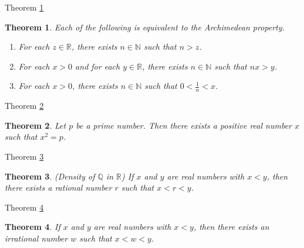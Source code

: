 \documentclass[avery5371,grid]{flashcards}
\newtheorem{theorem}{Theorem}
\newcommand{\bb}[1]{\mathbb{#1}}
\newcommand{\Q}{\bb{Q}}
\newcommand{\R}{\bb{R}}
\newcommand{\N}{\bb{N}}
\begin{document}
\begin{flashcard}[Theorem]{Theorem \ref{thm37}}
\begin{theorem}
\label{thm37}
Each of the following is equivalent to the Archimedean property.
\begin{enumerate}
\item For each $z \in \R$, there exists $n\in \N$ such that $n>z$.
\item For each $x>0$ and for each $y \in \R$, there exists $n \in \N$
such that $nx > y$.
\item For each $x > 0$, there exists $n \in \N$ such that
$0 < \frac{1}{n} < x$.
\end{enumerate}
\end{theorem}
\end{flashcard}

\begin{flashcard}[Theorem]{Theorem \ref{thm38}}
\begin{theorem}
\label{thm38}
Let $p$ be a prime number.  Then there exists a positive real number $x$
such that $x^2=p$.
\end{theorem}
\end{flashcard}

\begin{flashcard}[Theorem]{Theorem \ref{thm39}}
\begin{theorem}
\label{thm39}
(Density of $\Q$ in $\R$)  If $x$ and $y$ are real numbers with $x<y$,
then there exists a rational number $r$ such that $x<r<y$.
\end{theorem}
\end{flashcard}

\begin{flashcard}[Theorem]{Theorem \ref{thm40}}
\begin{theorem}
\label{thm40}
If $x$ and $y$ are real numbers with $x<y$, then there exists an
irrational number $w$ such that $x<w<y$.
\end{theorem}
\end{flashcard}
\end{document}
